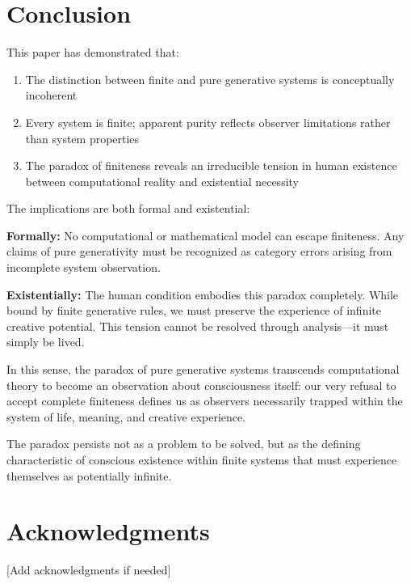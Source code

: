 \documentclass[11pt,a4paper]{article}
\begin{document}
    \section{Conclusion}

    This paper has demonstrated that:

    \begin{enumerate}
        \item The distinction between finite and pure generative systems is conceptually incoherent
        \item Every system is finite; apparent purity reflects observer limitations rather than system properties
        \item The paradox of finiteness reveals an irreducible tension in human existence between computational reality and existential necessity
    \end{enumerate}

    The implications are both formal and existential:

    \textbf{Formally:} No computational or mathematical model can escape finiteness. Any claims of pure generativity must be recognized as category errors arising from incomplete system observation.

    \textbf{Existentially:} The human condition embodies this paradox completely. While bound by finite generative rules, we must preserve the experience of infinite creative potential. This tension cannot be resolved through analysis—it must simply be lived.

    In this sense, the paradox of pure generative systems transcends computational theory to become an observation about consciousness itself: our very refusal to accept complete finiteness defines us as observers necessarily trapped within the system of life, meaning, and creative experience.

    The paradox persists not as a problem to be solved, but as the defining characteristic of conscious existence within finite systems that must experience themselves as potentially infinite.

    \section*{Acknowledgments}

    [Add acknowledgments if needed]
\end{document}
